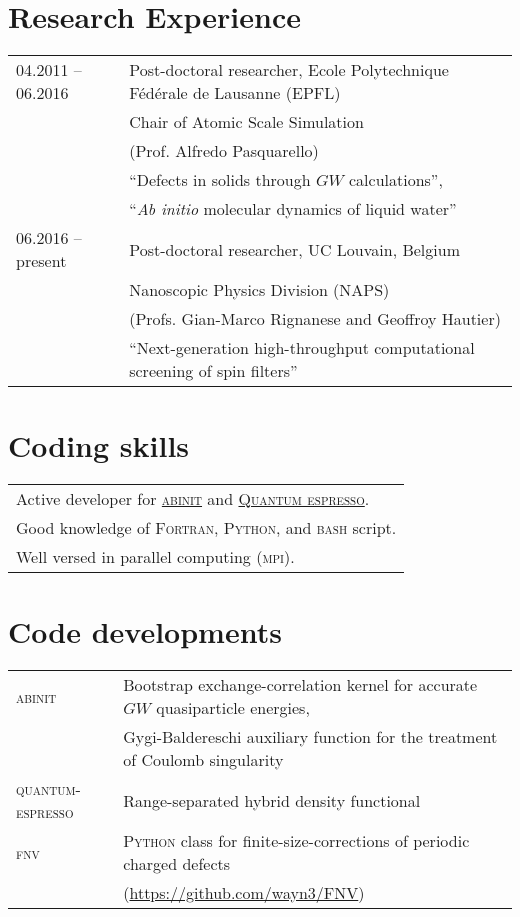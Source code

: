 \documentclass[a4paper, 11pt, DIV=15,headings=normal]{scrartcl}
\begin{document}
\section*{Research Experience}
\begin{tabular}{ll}
04.2011 -- 06.2016 & Post-doctoral researcher, Ecole Polytechnique F\'{e}d\'{e}rale de Lausanne (EPFL) \\
                   & Chair of Atomic Scale Simulation  \\
                   & (Prof. Alfredo Pasquarello) \\
                   & ``Defects in solids through $GW$ calculations'', \\
                   & ``\textit{Ab initio} molecular dynamics of liquid water'' \\
06.2016 -- present & Post-doctoral researcher, UC Louvain, Belgium \\
                   & Nanoscopic Physics Division (NAPS) \\ 
                   & (Profs. Gian-Marco Rignanese and Geoffroy Hautier)  \\
                   & ``Next-generation high-throughput computational
                     screening of spin filters''
\end{tabular}

\section*{Coding skills}
\begin{tabular}{l}
Active developer for \href{http://www.abinit.org}{\textsc{abinit}} and 
\href{http://www.quantum-espresso.org}{\textsc{Quantum espresso}}. \\
Good knowledge of \textsc{Fortran}, \textsc{Python}, and \textsc{bash} script.\\
Well versed in parallel computing (\textsc{mpi}). \\
\end{tabular}


\section*{Code developments}
\begin{tabular}{ll}
\textsc{abinit}  & Bootstrap exchange-correlation kernel for accurate $GW$ quasiparticle energies, \\
                 & Gygi-Baldereschi auxiliary function for the treatment of
Coulomb singularity \\
\textsc{quantum-espresso} & Range-separated hybrid density functional \\
\textsc{fnv}     & \textsc{Python} class for finite-size-corrections of
periodic charged defects \\
                 & (\url{https://github.com/wayn3/FNV})
\\
\end{tabular} 
\end{document}
